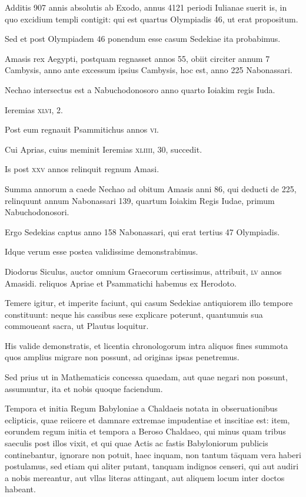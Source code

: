 \begin{parnumbers}
Additis 907 annis absolutis ab Exodo,
annus 4121 periodi Iulianae suerit is, in quo excidium templi contigit:
qui est quartus Olympiadis 46, ut erat propositum.

Sed et post
Olympiadem 46 ponendum esse casum Sedekiae ita probabimus.

Amasis rex Aegypti, postquam regnasset annos 55, obiit circiter annum
7 Cambysis, anno ante excessum ipsius Cambysis, hoc est, anno
225  Nabonassari.

Nechao intersectus est a Nabuchodonosoro anno
quarto Ioiakim regis Iuda.

Ieremias \textsc{xlvi}, 2.

Post eum regnauit
Psammitichus annos \textsc{vi}.

Cui Aprias, cuius meminit Ieremias
\textsc{xliiii}, 30, succedit.

Is post \textsc{xxv} annos relinquit regnum Amasi.

Summa annorum a caede Nechao ad obitum Amasis anni 86, qui
deducti de 225, relinquunt annum Nabonassari 139, quartum Ioiakim
Regis Iudae, primum Nabuchodonosori.

Ergo Sedekias captus
anno 158 Nabonassari, qui erat tertius 47 Olympiadis.

Idque verum
esse postea validissime demonstrabimus.

Diodorus Siculus,
auctor omnium Graecorum certissimus, attribuit, \textsc{lv} annos Amasidi.
reliquos Apriae et Psammatichi habemus ex Herodoto.

Temere
igitur, et imperite faciunt, qui casum Sedekiae antiquiorem illo
tempore constituunt: neque his cassibus sese explicare poterunt,
quantumuis sua commoueant sacra, ut Plautus loquitur.

His valide
demonstratis, et licentia chronologorum intra aliquos fines summota
quos amplius migrare non possunt, ad originas ipsas penetremus.

Sed prius ut in Mathematicis concessa quaedam, aut quae negari
non possunt, assumuntur, ita et nobis quoque faciendum.

Tempora et initia Regum Babyloniae a Chaldaeis notata in obseruationibus
eclipticis, quae reiicere et damnare extremae impudentiae et
inscitiae est: item, eorundem regum initia et tempora a Beroso Chaldaeo,
qui minus quam tribus saeculis post illos vixit, et qui quae Actis
ac fastis Babyloniorum publicis continebantur, ignorare non potuit,
haec inquam, non tantum tāquam vera haberi postulamus, sed etiam
qui aliter putant, tanquam indignos censeri, qui aut audiri a nobis
mereantur, aut vllas literas attingant, aut aliquem locum inter
doctos habeant.


\end{parnumbers}
